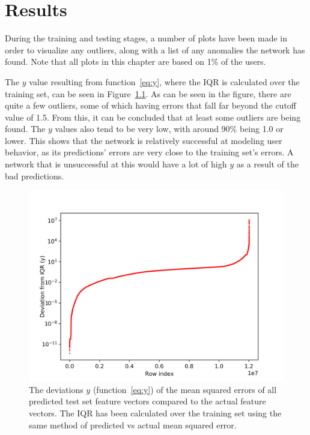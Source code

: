 \chapter{Results}\label{ch:results}

During the training and testing stages, a number of plots have been made in order to visualize any outliers, along with a list of any anomalies the network has found. Note that all plots in this chapter are based on 1\% of the users.

The \(y\) value resulting from function~\ref{eq:y}, where the IQR is calculated over the training set, can be seen in Figure~\ref{fig:iqr_scale}. As can be seen in the figure, there are quite a few outliers, some of which having errors that fall far beyond the cutoff value of 1.5. From this, it can be concluded that at least some outliers are being found. The \(y\) values also tend to be very low, with around 90\% being 1.0 or lower. This shows that the network is relatively successful at modeling user behavior, as its predictions' errors are very close to the training set's errors. A network that is unsuccessful at this would have a lot of high \(y\) as a result of the bad predictions.

\begin{figure}
	\begin{center}
		\includegraphics[scale=1.6]{results/all_deviations}
	\end{center}
	\caption{The deviations \(y\) (function~\ref{eq:y}) of the mean squared errors of all predicted test set feature vectors compared to the actual feature vectors. The IQR has been calculated over the training set using the same method of predicted vs actual mean squared error.~\label{fig:iqr_scale}}
\end{figure}

